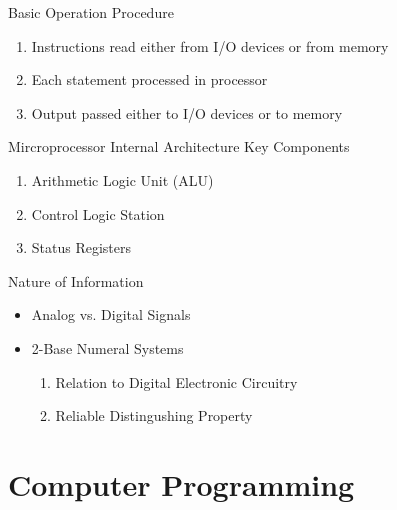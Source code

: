 \documentclass[10pt, compress]{beamer}
\begin{document}
\begin{slide}
	\begin{block}{Basic Operation Procedure}
		\begin{enumerate}
			\item[] Instructions read either from I/O devices or from memory
			\item[] Each statement processed in processor
			\item[] Output passed either to I/O devices or to memory
		\end{enumerate}
	\end{block}
\end{slide}

\begin{slide}
	\begin{block}{Mircroprocessor Internal Architecture}
		Key Components
		\begin{enumerate}
			\item[] Arithmetic Logic Unit (ALU)
			\item[] Control Logic Station
			\item[] Status Registers
		\end{enumerate}
	\end{block}
\end{slide}

\begin{slide}
	\begin{block}{Nature of Information}
		\begin{itemize}
			\item[] Analog vs. Digital Signals
			\item[] 2-Base Numeral Systems
				\begin{enumerate}
					\item[] Relation to Digital Electronic Circuitry
					\item[] Reliable Distingushing Property
				\end{enumerate}
		\end{itemize}
	\end{block}
\end{slide}

\section{Computer Programming}
\end{document}
